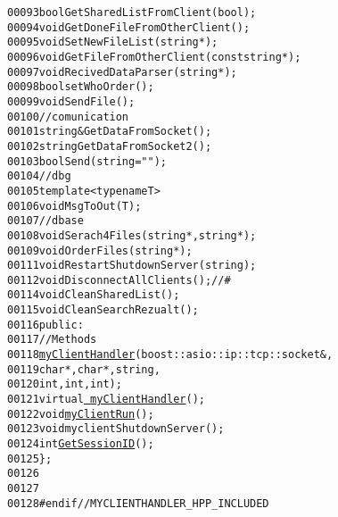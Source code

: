 \begin{footnotesize}
\begin{alltt}
00093         \textcolor{keywordtype}{bool} GetSharedListFromClient(\textcolor{keywordtype}{bool});
00094         \textcolor{keywordtype}{void} GetDoneFileFromOtherClient();
00095         \textcolor{keywordtype}{void} SetNewFileList(\textcolor{keywordtype}{string}*);
00096         \textcolor{keywordtype}{void} GetFileFromOtherClient(\textcolor{keyword}{const} \textcolor{keywordtype}{string}*);
00097         \textcolor{keywordtype}{void} RecivedDataParser(\textcolor{keywordtype}{string}*);
00098         \textcolor{keywordtype}{bool} setWhoOrder();
00099         \textcolor{keywordtype}{void} SendFile();
00100         \textcolor{comment}{//comunication}
00101         \textcolor{keywordtype}{string} &GetDataFromSocket();
00102         \textcolor{keywordtype}{string} GetDataFromSocket2();
00103         \textcolor{keywordtype}{bool} Send(\textcolor{keywordtype}{string} =\textcolor{stringliteral}{""});
00104         \textcolor{comment}{//dbg}
00105         \textcolor{keyword}{template} <\textcolor{keyword}{typename} T>
00106         \textcolor{keywordtype}{void} MsgToOut(T);
00107         \textcolor{comment}{//dbase}
00108         \textcolor{keywordtype}{void} Serach4Files(\textcolor{keywordtype}{string}*,\textcolor{keywordtype}{string}*);
00109         \textcolor{keywordtype}{void} OrderFiles(\textcolor{keywordtype}{string}*);
00111         \textcolor{keywordtype}{void} RestartShutdownServer(\textcolor{keywordtype}{string});
00112         \textcolor{keywordtype}{void} DisconnectAllClients();\textcolor{comment}{//#}
00114 \textcolor{comment}{}        \textcolor{keywordtype}{void} CleanSharedList();
00115         \textcolor{keywordtype}{void} CleanSearchRezualt();
00116     \textcolor{keyword}{public}:
00117         \textcolor{comment}{//Methods}
00118         \hyperlink{classmyClientHandler}{myClientHandler}(boost::asio::ip::tcp::socket &,
00119                         \textcolor{keywordtype}{char}*,\textcolor{keywordtype}{char}*,\textcolor{keywordtype}{string},
00120                         \textcolor{keywordtype}{int},\textcolor{keywordtype}{int},\textcolor{keywordtype}{int});
00121         \textcolor{keyword}{virtual} \hyperlink{classmyClientHandler_a20a6d3fcd1d40b107df3b508872e4342}{~myClientHandler}();
00122         \textcolor{keywordtype}{void} \hyperlink{classmyClientHandler_ab189bfb1e7dba2f101a187161bd03e4d}{myClientRun}();
00123         \textcolor{keywordtype}{void} myclientShutdownServer();
00124         \textcolor{keywordtype}{int} \hyperlink{classmyClientHandler_a9a158082b71de6585113cfbad406ddf5}{GetSessionID}();
00125 \};
00126 
00127 
00128 \textcolor{preprocessor}{#endif // MYCLIENTHANDLER\_HPP\_INCLUDED}
\end{alltt}\end{footnotesize}
